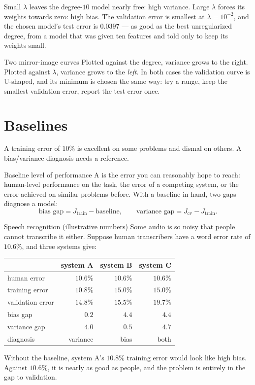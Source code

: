 Small $\lambda$ leaves the degree-$10$ model nearly free: high variance. Large
$\lambda$ forces its weights towards zero: high bias. The validation error is
smallest at $\lambda = 10^{-2}$, and the chosen model's test error is $0.0397$
--- as good as the best unregularized degree, from a model that was given ten
features and told only to keep its weights small.

\begin{keyinsight}{Two mirror-image curves}
Plotted against the degree, variance grows to the right. Plotted against
$\lambda$, variance grows to the \emph{left}. In both cases the validation curve
is U-shaped, and its minimum is chosen the same way: try a range, keep the
smallest validation error, report the test error once.
\end{keyinsight}

\section{Baselines}
\label{sec:baseline}

A training error of $10\%$ is excellent on some problems and dismal on others. A
bias/variance diagnosis needs a reference.

\begin{defbox}{Baseline level of performance}
A  is the error you can reasonably hope to reach: human-level
performance on the task, the error of a competing system, or the error achieved
on similar problems before. With a baseline in hand, two gaps diagnose a model:
\[
  \text{bias gap} = J_{\text{train}} - \text{baseline}, \qquad
  \text{variance gap} = J_{\text{cv}} - J_{\text{train}} .
\]
\end{defbox}

\begin{workedexample}{Speech recognition (illustrative numbers)}
Some audio is so noisy that people cannot transcribe it either. Suppose human
transcribers have a word error rate of $10.6\%$, and three systems give:

\begin{center}
\small
\renewcommand{\arraystretch}{1.15}
\begin{tabular}{@{}lrrr@{}}
\toprule
 & system A & system B & system C\\
\midrule
human error      & $10.6\%$ & $10.6\%$ & $10.6\%$\\
training error   & $10.8\%$ & $15.0\%$ & $15.0\%$\\
validation error & $14.8\%$ & $15.5\%$ & $19.7\%$\\
\midrule
bias gap         & $0.2$ & $4.4$ & $4.4$\\
variance gap     & $4.0$ & $0.5$ & $4.7$\\
\midrule
diagnosis        & variance & bias & both\\
\bottomrule
\end{tabular}
\end{center}

Without the baseline, system A's $10.8\%$ training error would look like high
bias. Against $10.6\%$, it is nearly as good as people, and the problem is
entirely in the gap to validation.
\end{workedexample}

